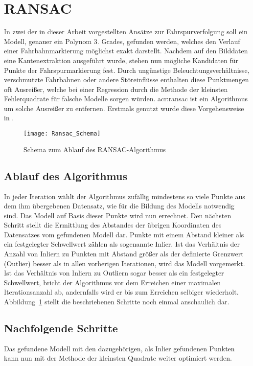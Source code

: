 \section{RANSAC \dcsecondauthorshort}
In zwei der in dieser Arbeit vorgestellten Ansätze zur Fahrspurverfolgung soll ein Modell, genauer ein Polynom 3. Grades, gefunden werden, welches den Verlauf einer Fahrbahnmarkierung möglichst exakt darstellt. Nachdem auf den Bilddaten eine Kantenextraktion ausgeführt wurde, stehen nun mögliche Kandidaten für Punkte der Fahrspurmarkierung fest. Durch ungünstige Beleuchtungsverhältnisse, verschmutzte Fahrbahnen oder andere Störeinflüsse enthalten diese Punktmengen oft Ausreißer, welche bei einer Regression durch die Methode der kleinsten Fehlerquadrate für falsche Modelle sorgen würden. \gls{acr:ransac} ist ein Algorithmus um solche Ausreißer zu entfernen. Erstmals genutzt wurde diese Vorgehensweise in \autocite{fischler1981random}.

\begin{figure}[htbp]
  \centering
  \texttt{[image: Ransac\_Schema]}
  \caption{Schema zum Ablauf des RANSAC-Algorithmus}
  \label{fig:ransac_scheme}
\end{figure}

\subsection{Ablauf des Algorithmus} \label{ssec:grunglagen:ransac:ablauf}
In jeder Iteration wählt der Algorithmus zufällig mindestens so viele Punkte aus dem ihm übergebenen Datensatz, wie für die Bildung des Modells notwendig sind. Das Modell auf Basis dieser Punkte wird nun errechnet. Den nächsten Schritt stellt die Ermittlung des Abstandes der übrigen Koordinaten des Datensatzes vom gefundenen Modell dar. Punkte mit einem Abstand kleiner als ein festgelegter Schwellwert zählen als sogenannte Inlier. Ist das Verhältnis der Anzahl von Inliern zu Punkten mit Abstand größer als der definierte Grenzwert (Outlier) besser als in allen vorherigen Iterationen, wird das Modell vorgemerkt. Ist das Verhältnis von Inliern zu Outliern sogar besser als ein festgelegter Schwellwert, bricht der Algorithmus vor dem Erreichen einer maximalen Iterationsanzahl ab, andernfalls wird er bis zum Erreichen selbiger wiederholt. Abbildung~\ref{fig:ransac_scheme} stellt die beschriebenen Schritte noch einmal anschaulich dar.

\subsection{Nachfolgende Schritte}
Das gefundene Modell mit den dazugehörigen, als Inlier gefundenen Punkten kann nun mit der Methode der kleinsten Quadrate weiter optimiert werden.




